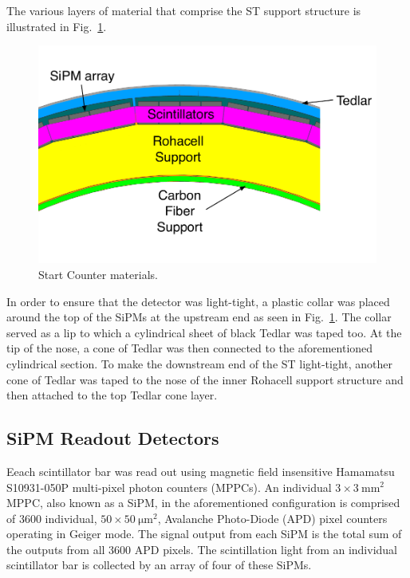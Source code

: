 The various layers of material that comprise the ST support structure is illustrated in Fig.~\ref{fig:stmaterials}.
	\begin{figure}[!htb]
		\centering
		\includegraphics[width=1.0\columnwidth]{design/figs/st_materials}
		\caption{Start Counter materials.}
		\label{fig:stmaterials}
	\end{figure}
In order to ensure that the detector was light-tight, a plastic collar was placed around the top of the SiPMs at the upstream end as seen in Fig.~\ref{fig:stmaterials}.  The collar served as a lip to which a cylindrical sheet of black Tedlar was taped too.  At the tip of the nose, a cone of Tedlar was then connected to the aforementioned cylindrical section.  To make the downstream end of the ST light-tight, another cone of Tedlar was taped to the nose of the inner Rohacell support structure and then attached to the top Tedlar cone layer. 


\subsection{SiPM Readout Detectors} \label{sec:design_sipms}

Eeach scintillator bar was read out using magnetic field insensitive Hamamatsu S10931-050P multi-pixel photon counters (MPPCs)\cite{hamamatsu}.  An individual $\mathrm{3 \times 3\ mm^2}$ MPPC, also known as a SiPM, in the aforementioned configuration is comprised of 3600 individual, $\mathrm{50 \times 50\ \mu m^2}$, Avalanche Photo-Diode (APD) pixel counters operating in Geiger mode. The signal output from each SiPM is the total sum of the outputs from all 3600 APD pixels\cite{sipm_spec}.  The scintillation light from an individual scintillator bar is collected by an array of four of these SiPMs.

